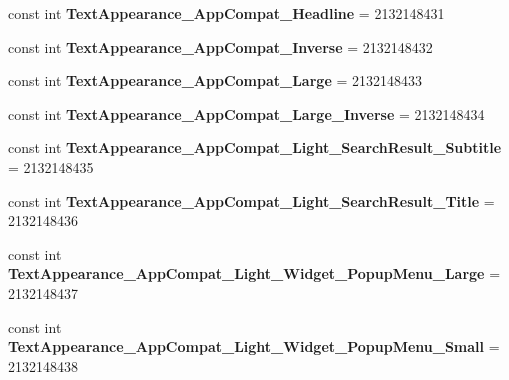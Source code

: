 \begin{DoxyCompactItemize}
const int {\bfseries Text\+Appearance\+\_\+\+App\+Compat\+\_\+\+Headline} = 2132148431
\item 
\mbox{\label{classst_delivery_1_1_resource_1_1_style_a226d9576d001c63d18a6e60771d3362d}} 
const int {\bfseries Text\+Appearance\+\_\+\+App\+Compat\+\_\+\+Inverse} = 2132148432
\item 
\mbox{\label{classst_delivery_1_1_resource_1_1_style_ab34aba2769bffc1a501866906d4f8e04}} 
const int {\bfseries Text\+Appearance\+\_\+\+App\+Compat\+\_\+\+Large} = 2132148433
\item 
\mbox{\label{classst_delivery_1_1_resource_1_1_style_ac68829cd53eb8e805f212f17179e016a}} 
const int {\bfseries Text\+Appearance\+\_\+\+App\+Compat\+\_\+\+Large\+\_\+\+Inverse} = 2132148434
\item 
\mbox{\label{classst_delivery_1_1_resource_1_1_style_a959fbb7d72fb7c04c6c74a9f39c049b7}} 
const int {\bfseries Text\+Appearance\+\_\+\+App\+Compat\+\_\+\+Light\+\_\+\+Search\+Result\+\_\+\+Subtitle} = 2132148435
\item 
\mbox{\label{classst_delivery_1_1_resource_1_1_style_a78d3ef33b285611b4b4d947add6ede40}} 
const int {\bfseries Text\+Appearance\+\_\+\+App\+Compat\+\_\+\+Light\+\_\+\+Search\+Result\+\_\+\+Title} = 2132148436
\item 
\mbox{\label{classst_delivery_1_1_resource_1_1_style_a60242b4d6ef4a4430ab044b12ba5e91c}} 
const int {\bfseries Text\+Appearance\+\_\+\+App\+Compat\+\_\+\+Light\+\_\+\+Widget\+\_\+\+Popup\+Menu\+\_\+\+Large} = 2132148437
\item 
\mbox{\label{classst_delivery_1_1_resource_1_1_style_a24187e46f8f82a4673339c0d1064ea94}} 
const int {\bfseries Text\+Appearance\+\_\+\+App\+Compat\+\_\+\+Light\+\_\+\+Widget\+\_\+\+Popup\+Menu\+\_\+\+Small} = 2132148438
\item 
\mbox{\label{classst_delivery_1_1_resource_1_1_style_aaba6cbadaf0ec1d69e554aca20cb6c44}} 

\end{DoxyCompactItemize}

